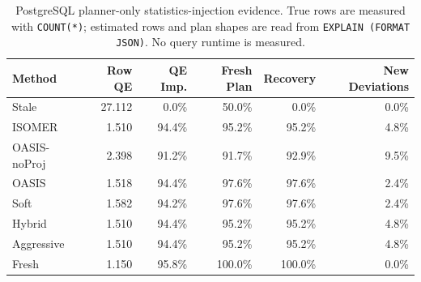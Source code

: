 \begin{table}[t]
  \centering
  \small
  \caption{PostgreSQL planner-only statistics-injection evidence. True rows are measured with \texttt{COUNT(*)}; estimated rows and plan shapes are read from \texttt{EXPLAIN (FORMAT JSON)}. No query runtime is measured.}
  \label{tab:postgres_planner_stats_injection}
  \setlength{\tabcolsep}{4pt}
  \begin{tabular}{lrrrrr}
    \toprule
    Method & Row QE & QE Imp. & Fresh Plan & Recovery & New Deviations \\
    \midrule
    Stale & 27.112 & 0.0\% & 50.0\% & 0.0\% & 0.0\% \\
    ISOMER & 1.510 & 94.4\% & 95.2\% & 95.2\% & 4.8\% \\
    OASIS-noProj & 2.398 & 91.2\% & 91.7\% & 92.9\% & 9.5\% \\
    OASIS & 1.518 & 94.4\% & 97.6\% & 97.6\% & 2.4\% \\
    Soft & 1.582 & 94.2\% & 97.6\% & 97.6\% & 2.4\% \\
    Hybrid & 1.510 & 94.4\% & 95.2\% & 95.2\% & 4.8\% \\
    Aggressive & 1.510 & 94.4\% & 95.2\% & 95.2\% & 4.8\% \\
    Fresh & 1.150 & 95.8\% & 100.0\% & 100.0\% & 0.0\% \\
    \bottomrule
  \end{tabular}
\end{table}
